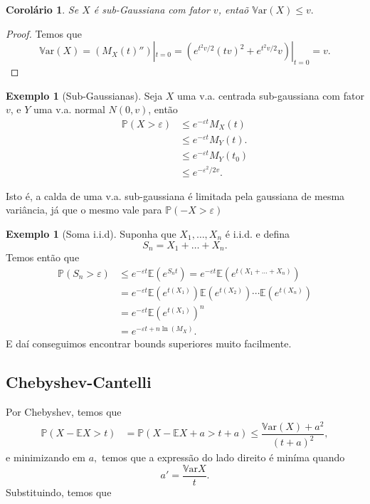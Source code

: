 \documentclass[12pt,a4paper,oneside]{book}
\newtheorem{corollary}[theorem]{Corol\'ario}
\theoremstyle{definition}
\newtheorem{example}[theorem]{Exemplo}
\theoremstyle{remark}
\numberwithin{equation}{section}
\newcommand{\e}{\varepsilon}
\newcommand{\E}{\mathbb{E}}
\newcommand{\pr}{\mathbb{P}}
\newcommand{\Var}{\mathbb{V}\text{ar}}
\begin{document}
\begin{corollary}
Se $X$ é sub-Gaussiana com fator $v$, entaõ $\Var(X)\leq v.$
\end{corollary}
\begin{proof}
Temos que 
$$\Var(X) = (M_X(t)'')|_{t=0}  = (e^{t^2v/2}(tv)^2 + e^{t^2v/2}v)|_{t=0} = v.$$
\end{proof}



\begin{example}[Sub-Gaussianas]
Seja $X$ uma v.a. centrada sub-gaussiana com fator $v$, e $Y$ uma v.a. normal $N(0,v)$, então
\begin{align*}
\pr(X>\e) & \leq  e^{-\e t}M_X(t)\\
	&\leq e^{-\e t}M_Y(t).\\
	&\leq e^{-\e t}M_Y(t_0)\\
	&\leq e^{-\e^2/2v}.
\end{align*}

\begin{tcolorbox}[colback = yellow!60]
Isto é, a calda de uma v.a. sub-gaussiana é limitada pela gaussiana de mesma variância, já que o mesmo vale para $ \pr(-X>\e)$ 
\end{tcolorbox}

\end{example}



\begin{example}[Soma i.i.d] Suponha que $X_1,\dots,X_n$ é i.i.d. e defina
$$S_n = X_1+\dots+X_n. $$
Temos então que
\begin{align*}
\pr(S_n>\e) & \leq  e^{-\e t}\E(e^{S_nt}) =e^{-\e t}\E(e^{t(X_1+\dots+X_n)}) \\
	&=e^{-\e t}\E(e^{t(X_1)})\E(e^{t(X_2)})\cdots\E(e^{t(X_n)})\\
	&=e^{-\e t}\E(e^{t(X_1)})^n\\
	&=e^{-\e t + n\ln(M_X)}.	
\end{align*}
E daí conseguimos encontrar bounds superiores muito facilmente.
\end{example}

\subsection{Chebyshev-Cantelli} Por Chebyshev, temos que
\begin{align*}
\pr(X-\E X> t) &= \pr(X-\E X +a> t+a) \leq \dfrac{\Var(X)+a^2}{(t+a)^2},
\end{align*}
e minimizando em $a,$ temos que a expressão do lado direito é miníma quando 
$$a' = \dfrac{\Var X}{t}.$$
Substituindo, temos que
\end{document}
